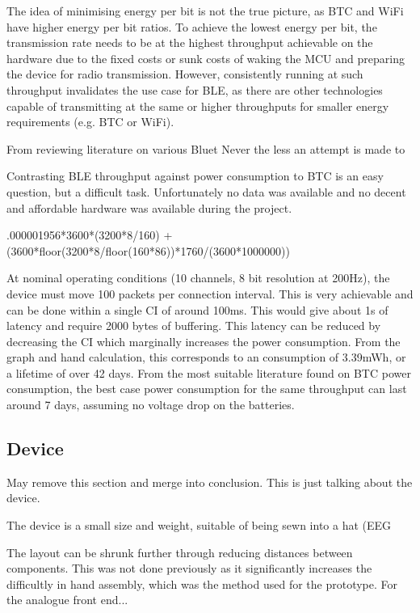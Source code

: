 \documentclass[]{article}
\begin{document}
The idea of minimising energy per bit is not the true picture, as \ac{BTC} and WiFi have higher energy per bit ratios. To achieve the lowest energy per bit, the transmission rate needs to be at the highest throughput achievable on the hardware due to the fixed costs or sunk costs of waking the \ac{MCU} and preparing the device for radio transmission. However, consistently running at such throughput invalidates the use case for \ac{BLE}, as there are other technologies capable of transmitting at the same or higher throughputs for smaller energy requirements (e.g. \ac{BTC} or WiFi). 

From reviewing literature on various Bluet
Never the less an attempt is made to 

Contrasting \ac{BLE} throughput against power consumption to \ac{BTC} is an easy question, but a difficult task. Unfortunately no data was available and no decent and affordable hardware was available during the project. 


.000001956*3600*(3200*8/160) + (3600*floor(3200*8/floor(160*86))*1760/(3600*1000000))

At nominal operating conditions (10 channels, 8 bit resolution at 200Hz), the device must move 100 packets per connection interval. This is very achievable and can be done within a single \ac{CI} of around 100ms. This would give about 1s of latency and require 2000 bytes of buffering. This latency can be reduced by decreasing the \ac{CI} which marginally increases the power consumption. From the graph and hand calculation, this corresponds to an consumption of 3.39mWh, or a lifetime of over 42 days. From the most suitable literature found \cite{rahuli} on \ac{BTC} power consumption, the best case power consumption for the same throughput can last around 7 days, assuming no voltage drop on the batteries. 












\subsection{Device}


May remove this section and merge into conclusion. This is just talking about the device.

The device is a small size and weight, suitable of being sewn into a hat (EEG

The layout can be shrunk further through reducing distances between components. This was not done previously as it significantly increases the difficultly in hand assembly, which was the method used for the prototype. For the analogue front end...
\end{document}
